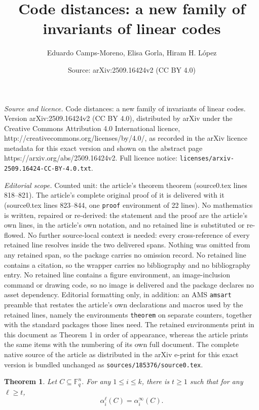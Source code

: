 \documentclass[10pt,a4paper]{amsart}
\title{Code distances: a new family of invariants of linear codes}
\author{Eduardo Camps-Moreno, Elisa Gorla, Hiram H. L\'opez}
\date{Source: arXiv:2509.16424v2 (CC BY 4.0)}
\newtheorem{theorem}{Theorem}
\begin{document}
\maketitle

\noindent\emph{Source and licence.} Code distances: a new family of invariants of linear codes. Version arXiv:2509.16424v2 (CC BY 4.0), distributed by arXiv under the Creative Commons Attribution 4.0 International licence, http://creativecommons.org/licenses/by/4.0/, as recorded in the arXiv licence metadata for this exact version and shown on the abstract page https://arxiv.org/abs/2509.16424v2. Full licence notice: \texttt{licenses/arxiv-2509.16424-CC-BY-4.0.txt}.\par\smallskip

\noindent\textit{Editorial scope.} Counted unit: the article's theorem theorem (source0.tex lines 818--821). The article's complete original proof of it is delivered with it (source0.tex lines 823--844, one \texttt{proof} environment of 22 lines). No mathematics is written, repaired or re-derived: the statement and the proof are the article's own lines, in the article's own notation, and no retained line is substituted or re-flowed.  No further source-local context is needed: every cross-reference of every retained line resolves inside the two delivered spans.  Nothing was omitted from any retained span, so the package carries no omission record.  No retained line contains a citation, so the wrapper carries no bibliography and no bibliography entry.  No retained line contains a figure environment, an image-inclusion command or drawing code, so no image is delivered and the package declares no asset dependency.  Editorial formatting only, in addition: an AMS \texttt{amsart} preamble that restates the article's own declarations and macros used by the retained lines, namely the environments \texttt{theorem} on separate counters, together with the standard packages those lines need.  The retained environments print in this document as Theorem 1 in order of appearance, whereas the article prints the same items with the numbering of its own full document.  The complete native source of the article as distributed in the arXiv e-print for this exact version is bundled unchanged as \texttt{sources/185376/source0.tex}.
\begin{theorem}
 Let $C\subseteq\mathbb{F}_q^n$. For any $1\leq i\leq k$, there is $t\geq 1$ such that for any $\ell\geq t$, 
 $$\alpha_i^\ell(C)=\alpha_i^\infty(C).$$
\end{theorem}
\end{document}
